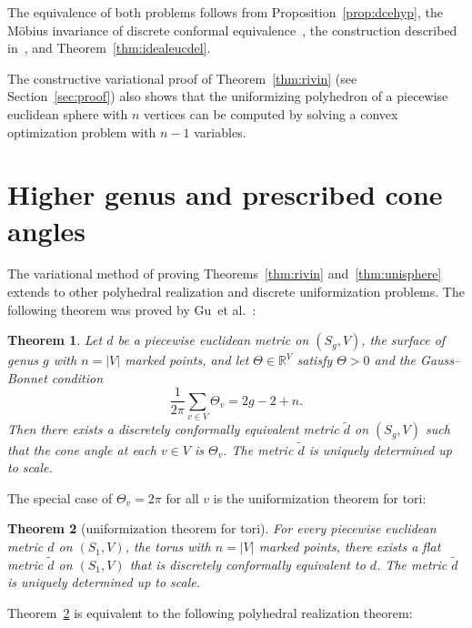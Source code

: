 \documentclass[a4paper, 11pt]{article}
\newcommand{\R}{\mathbb{R}}
\newcommand{\etal}{{et al.}}
\newcommand{\dtil}{\tilde{d}}
\theoremstyle{plain}
\newtheorem{theorem}{Theorem}[section]
\theoremstyle{definition}
\begin{document}
The equivalence of both problems follows from
Proposition~\ref{prop:dcehyp}, the M{\"o}bius invariance of discrete
conformal equivalence~\cite[Sec.~2.5]{bobenko15}, the construction
described in~\cite[Sec.~5.4]{bobenko15}, and
Theorem~\ref{thm:idealeucdel}.

The constructive variational proof of Theorem~\ref{thm:rivin}
(see Section~\ref{sec:proof}) also shows that the uniformizing polyhedron
of a piecewise euclidean sphere with $n$ vertices can be computed by
solving a convex optimization problem with $n-1$ variables.

\section{Higher genus and prescribed cone angles}
\label{sec:highergenus}

The variational method of proving Theorems~\ref{thm:rivin}
and~\ref{thm:unisphere} extends to other polyhedral realization
and discrete uniformization problems. The following theorem was proved
by Gu~\etal~\cite{luo13}:

\begin{theorem}
  \label{thm:luo13}
  Let $d$ be a piecewise euclidean metric on $(S_{g},V)$, the surface
  of genus $g$ with $n=|V|$ marked points, and let $\Theta\in\R^{V}$
  satisfy $\Theta>0$ and the Gauss--Bonnet condition
  \begin{equation}
    \label{eq:GB}
    \frac{1}{2\pi}\sum_{v\in V}\Theta_{v}=2g-2+n.
  \end{equation}
  Then there exists a discretely conformally equivalent metric $\dtil$
  on $(S_{g},V)$ such that the cone angle at each $v\in V$ is
  $\Theta_{v}$. The metric $\dtil$ is uniquely determined up to scale.
\end{theorem}

The special case of $\Theta_{v}=2\pi$ for all $v$ is the
uniformization theorem for tori:

\begin{theorem}[uniformization theorem for tori]
  \label{thm:uniformtori}
  For every piecewise euclidean metric $d$ on $(S_{1},V)$, the torus
  with $n=|V|$ marked points, there exists a flat metric $\dtil$ on
  $(S_{1},V)$ that is discretely conformally equivalent to $d$. The
  metric $\dtil$ is uniquely determined up to scale. 
\end{theorem}

Theorem~\ref{thm:uniformtori} is equivalent to the following
polyhedral realization theorem:
\end{document}
